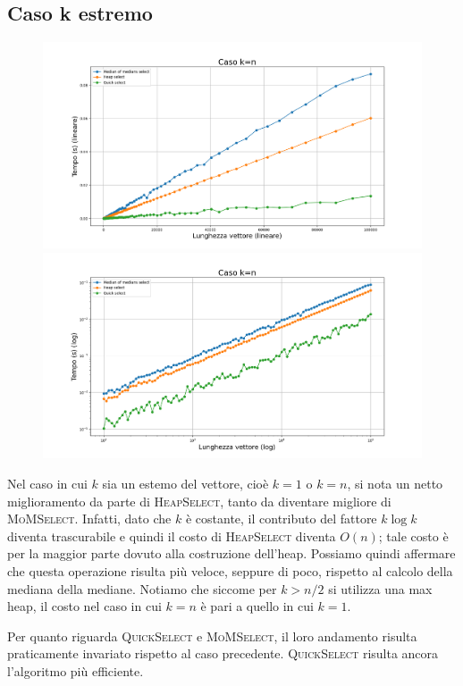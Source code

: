\documentclass[a4paper,12pt]{article}
\newcommand{\QuickSelect}{\textsc{QuickSelect}}
\newcommand{\HeapSelect}{\textsc{HeapSelect}}
\newcommand{\MoMSelect}{\textsc{MoMSelect}}
\begin{document}
\subsection{Caso k estremo}
\begin{figure}[h]
            \centering
            \includegraphics[width=.83\textwidth]{graphs/k_last_n.png}
            \includegraphics[width=.83\textwidth]{graphs/k_last_2xlog.png}
\end{figure}
Nel caso in cui $k$ sia un estemo del vettore, cioè $k=1$ o $k=n$, si nota un netto miglioramento da parte di \HeapSelect{}, tanto da diventare migliore di \MoMSelect{}.
Infatti, dato che $k$ è costante, il contributo del fattore $k\log k$ diventa trascurabile e quindi il costo di \HeapSelect{} diventa $O(n)$; tale costo è per la maggior parte dovuto alla costruzione dell'heap.
Possiamo quindi affermare che questa operazione risulta più veloce, seppure di poco, rispetto al calcolo della mediana della mediane.
Notiamo che siccome per $k > n/2$ si utilizza una max heap, il costo nel caso in cui $k=n$ è pari a quello in cui $k=1$.

Per quanto riguarda \QuickSelect{} e \MoMSelect{}, il loro andamento risulta praticamente invariato rispetto al caso precedente.
\QuickSelect{} risulta ancora l'algoritmo più efficiente.


\newpage
\end{document}
